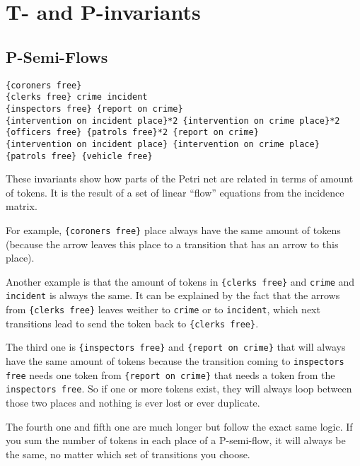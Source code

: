 \section{T- and P-invariants}
\label{sec:T- and P-invariants}

\subsection{P-Semi-Flows}

\begin{lstlisting}
{coroners free}
{clerks free} crime incident
{inspectors free} {report on crime}
{intervention on incident place}*2 {intervention on crime place}*2 {officers free} {patrols free}*2 {report on crime}
{intervention on incident place} {intervention on crime place} {patrols free} {vehicle free}
\end{lstlisting}

These invariants show how parts of the Petri net are related in terms of amount
of tokens. It is the result of a set of linear \enquote{flow} equations from the
incidence matrix. \newline

For example, \verb#{coroners free}# place always have the same amount of tokens
(because the arrow leaves this place to a transition that has an arrow to this
place). \newline

Another example is that the amount of tokens in \verb#{clerks free}# and
\verb#crime# and \verb#incident# is always the same. It can be explained by the
fact that the arrows from \verb#{clerks free}# leaves weither to \verb#crime#
or to \verb#incident#, which next transitions lead to send the token back to
\verb#{clerks free}#. \newline

The third one is \verb#{inspectors free}# and \verb#{report on crime}# that will always
have the same amount of tokens because the transition coming to
\verb#inspectors free# needs one token from \verb#{report on crime}# that needs a token
from the \verb#inspectors free#. So if one or more tokens exist, they will
always loop between those two places and nothing is ever lost or ever
duplicate. \newline

The fourth one and fifth one are much longer but follow the exact same logic.
If you sum the number of tokens in each place of a P-semi-flow, it will always
be the same, no matter which set of transitions you choose. \newline

